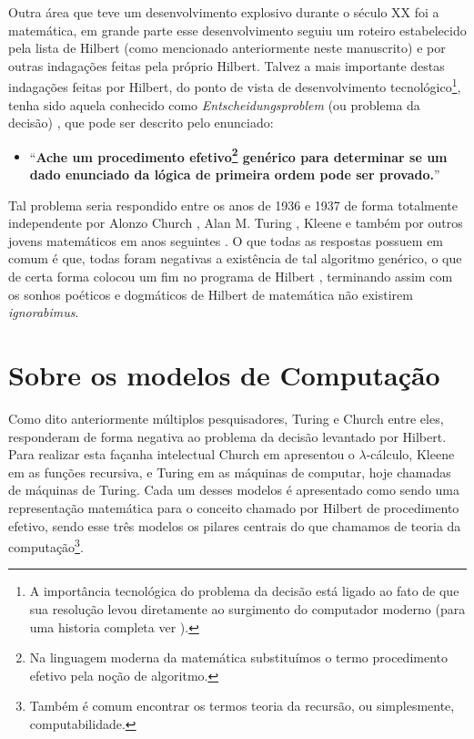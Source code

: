 Outra área que teve um desenvolvimento explosivo durante o século XX foi a matemática, em grande parte esse desenvolvimento seguiu um roteiro estabelecido pela lista de Hilbert (como mencionado anteriormente neste manuscrito) e por outras indagações feitas pela próprio Hilbert. Talvez a mais importante destas indagações feitas por Hilbert, do ponto de vista de desenvolvimento tecnológico\footnote{A importância tecnológica do problema da decisão está ligado ao fato de que sua resolução levou diretamente ao surgimento do computador moderno (para uma historia completa ver \cite{fonseca2007}).}, tenha sido aquela conhecido como \textit{Entscheidungsproblem} (ou problema da decisão) \cite{fonseca2007}, que pode ser descrito pelo enunciado:
\begin{itemize}
	\item[ ] ``\textbf{Ache um procedimento efetivo\footnote{Na linguagem moderna da matemática substituímos o termo procedimento efetivo pela noção de algoritmo.} genérico para determinar se um dado enunciado da lógica de primeira ordem pode ser provado.}''
\end{itemize}
Tal problema seria respondido entre os anos de 1936 e 1937 de forma totalmente independente por Alonzo Church \cite{church1936b, church1936}, Alan M. Turing \cite{britton1992, herken1992, turing1937}, Kleene \cite{kleene1936} e também por outros jovens matemáticos em anos seguintes \cite{shepherdson1963}. O que todas as respostas possuem em comum é que, todas foram negativas a existência de tal algoritmo genérico, o que de certa forma colocou um fim no programa de Hilbert \cite{abramsky1992, ullman1992, sernadas2006}, terminando assim com os sonhos poéticos e dogmáticos de Hilbert \cite{fonseca2007} de matemática não existirem \textit{ignorabimus}.

\section{Sobre os modelos de Computação}

Como dito anteriormente múltiplos pesquisadores, Turing e Church entre eles, responderam de forma negativa ao problema da decisão levantado por Hilbert. Para realizar esta façanha intelectual Church em \cite{church1936} apresentou o $\lambda$-cálculo, Kleene em \cite{kleene1936} as funções recursiva, e Turing em \cite{turing1937} as máquinas de computar, hoje chamadas de máquinas de Turing. Cada um desses modelos é apresentado como sendo uma representação matemática para o conceito chamado por Hilbert de procedimento efetivo, sendo esse três modelos os pilares centrais do que chamamos de teoria da computação\footnote{Também é comum encontrar os termos teoria da recursão, ou simplesmente, computabilidade.}. 

